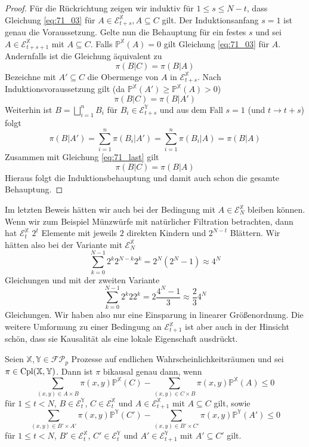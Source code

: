 \begin{proof}
Für die Rückrichtung zeigen wir induktiv für $1 \leq s\leq N-t$, dass Gleichung \ref{eq:71_03} für $A \in \mathcal{E}_{t+s}^\mathbb{X}, A\subseteq C$ gilt. Der Induktionsanfang $s=1$ ist genau die Voraussetzung. Gelte nun die Behauptung für ein festes $s$ und sei $A \in \mathcal{E}_{t+s+1}^\mathbb{X}$ mit $A \subseteq C$. Falls $\mathbb{P}^\mathbb{X}(A)=0$ gilt Gleichung \ref{eq:71_03} für $A$. Andernfalls ist die Gleichung äquivalent zu 
$$\pi(B \vert C) = \pi(B \vert A)$$
Bezeichne mit $A' \subseteq C$ die Obermenge von $A$ in $\mathcal{E}_{t+s}^\mathbb{X}$. Nach Induktionsvoraussetzung gilt (da $\mathbb{P}^\mathbb{X}(A') \geq \mathbb{P}^\mathbb{X}(A)> 0$)
\begin{equation}\label{eq:71_last}
    \pi(B \vert C) = \pi(B \vert A')
\end{equation}
Weiterhin ist $B = \bigsqcup_{i=1}^n B_i$ für $B_i \in \mathcal{E}_{t+s}^\mathbb{Y}$ und aus dem Fall $s=1$ (und $t \rightarrow t+s$) folgt
$$\pi(B \vert A') = \sum_{i=1}^n \pi(B_i \vert A') = \sum_{i=1}^n \pi(B_i \vert A) = \pi(B \vert A)$$
Zusammen mit Gleichung \ref{eq:71_last} gilt
$$\pi(B \vert C) = \pi(B \vert A)$$
Hieraus folgt die Induktionsbehauptung und damit auch schon die gesamte Behauptung.
\end{proof}
\begin{remark}
    Im letzten Beweis hätten wir auch bei der Bedingung mit $A \in \mathcal{E}_N^\mathbb{X}$ bleiben können. Wenn wir zum Beispiel Münzwürfe mit natürlicher Filtration betrachten, dann hat $\mathcal{E}_t^\mathbb{X}$ $2^t$ Elemente mit jeweils $2$ direkten Kindern und $2^{N-t}$ Blättern. Wir hätten also bei der Variante mit $\mathcal{E}_N^\mathbb{X}$ 
    $$\sum_{k=0}^{N-1} 2^k2^{N-k}2^k=2^N(2^N-1) \approx 4^N$$
    Gleichungen und mit der zweiten Variante
    $$\sum_{k=0}^{N-1} 2^k22^k = 2\frac{4^N-1}{3} \approx \frac{2}{3}4^N$$
    Gleichungen. Wir haben also nur eine Einsparung in linearer Größenordnung. Die weitere Umformung zu einer Bedingung an $\mathcal{E}_{t+1}^\mathbb{X}$ ist aber auch in der Hinsicht schön, dass sie Kausalität als eine lokale Eigenschaft ausdrückt.
\end{remark}
\begin{corollary}
Seien $\mathbb{X,Y} \in \mathcal{FP}_p$ Prozesse auf endlichen Wahrscheinlichkeitsräumen und sei $\pi \in \operatorname{Cpl}(\mathbb{X,Y})$. Dann ist $\pi$ bikausal genau dann, wenn
$$\sum_{(x,y) \in A \times B} \pi(x,y) \mathbb{P}^\mathbb{X}(C) - \sum_{(x,y) \in C \times B} \pi(x,y) \mathbb{P}^\mathbb{X}(A)\leq 0$$
für $1\leq t < N$, $B \in \mathcal{E}_t^\mathbb{Y}$, $C \in \mathcal{E}_t^\mathbb{X}$ und $A \in \mathcal{E}_{t+1}^\mathbb{X}$ mit $A\subseteq C$ gilt, sowie
$$\sum_{(x,y) \in B' \times A'} \pi(x,y) \mathbb{P}^\mathbb{Y}(C') - \sum_{(x,y) \in B' \times C'} \pi(x,y) \mathbb{P}^\mathbb{Y}(A') \leq 0$$
für $1\leq t<N$, $B' \in \mathcal{E}_t^\mathbb{X}$, $C' \in \mathcal{E}_t^\mathbb{Y}$ und $A' \in \mathcal{E}_{t+1}^\mathbb{Y}$ mit $A'\subseteq C'$ gilt.
\end{corollary}\label{thm:bicausality_finite_case}
